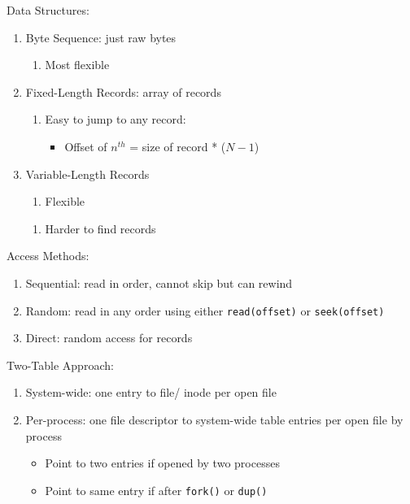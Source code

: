\documentclass[12pt, a4paper]{article}
\begin{document}
\begin{multicols*}{3}
Data Structures:
\begin{enumerate}[\roman*.]
  \item Byte Sequence: just raw bytes\vspace{3pt}
    \begin{enumerate}[$+$]
      \item Most flexible
    \end{enumerate}
  \item Fixed-Length Records: array of records 
    \begin{enumerate}[$+$]
      \item Easy to jump to any record:\vspace{3pt}
      \begin{itemize}[leftmargin=*]
        \item Offset of $n^{th}$ = size of record * ($N-1$)
      \end{itemize}
    \end{enumerate}
  \item Variable-Length Records\vspace{2pt}
    \begin{enumerate}[$+$]
      \item Flexible
    \end{enumerate}\vspace{3pt}
    \begin{enumerate}[$-$]
      \item Harder to find records
    \end{enumerate}
\end{enumerate}

Access Methods:
\begin{enumerate}[\roman*.]
  \item Sequential: read in order, cannot skip but can rewind
  \item Random: read in any order using either \lstinline|read(offset)| or \lstinline|seek(offset)|
  \item Direct: random access for records
\end{enumerate}

\colbreak
Two-Table Approach:
\begin{enumerate}[\roman*.]
  \item System-wide: one entry to file/ inode per open file 
  \item Per-process: one file descriptor to system-wide table entries per open file by process\vspace{1pt}
    \begin{itemize}[leftmargin=*]
      \item Point to two entries if opened by two processes
      \item Point to same entry if after \lstinline|fork()| or \lstinline|dup()|
    \end{itemize}
\end{enumerate}


\end{multicols*}
\end{document}
